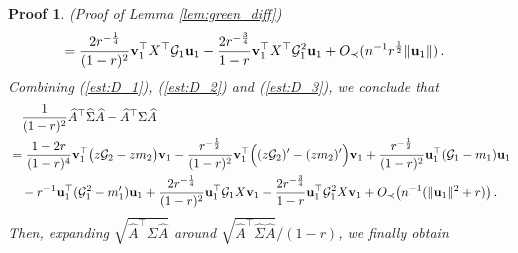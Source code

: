 \documentclass[12pt]{article}
\numberwithin{equation}{section}
\newtheorem{myPro}{Proof}
\theoremstyle{remark}
\newcommand{\1}{{\rm 1}\kern-0.24em{\rm I}}
\begin{document}
\begin{appendices}
\begin{myPro}{(Proof of Lemma \ref{lem:green_diff})}
\begin{align}
  &= \frac{2r^{-\frac 14}}{(1-r)^2}  {\bf v}_1^{\top} {X}^{\top} \mathcal{G}_1{\bf u}_1 - \frac{2r^{-\frac 34}}{1-r}{\bf v}_1^{\top} {X}^{\top} \mathcal{G}_1^2{\bf u}_1  + O_\prec(n^{-1}r^{\frac 12} \Vert {\bf u}_1\Vert)\,.
 \end{align}
Combining (\ref{est:D_1}), (\ref{est:D_2}) and (\ref{est:D_3}), we  conclude that 
\begin{align}\label{est:Repre_1}
&\quad \frac{1}{(1-r)^2} \widehat A^{\top}\widehat\Sigma \widehat A - \widehat A^{\top}\Sigma \widehat A\notag\\
&= \frac{1-2r}{(1-r)^4} {\bf v}_1^{\top} \big( z\mathcal{G}_2-zm_2\big){\bf v}_1  - \frac{r^{-\frac 12}}{(1-r)^2} {\bf v}_1^{\top}\Big((z\mathcal{G}_2)'-(zm_2)'\Big){\bf v}_1 +  \frac{r^{-\frac 12}}{(1-r)^2} {\bf u}_1^{\top}(\mathcal{G}_1-m_1){\bf u}_1  \notag\\
& \quad - r^{-1}{\bf u}_1^{\top}(\mathcal{G}_1^2- m_1'){\bf u}_1 +  \frac{2r^{-\frac 14}}{(1-r)^2}{\bf u}_1^{\top}  \mathcal{G}_1 {X}{\bf v}_1- \frac{2r^{-\frac 34}}{1-r}  {\bf u}_1^{\top} \mathcal{G}_1^2 {X}{\bf v}_1+ O_\prec\big(n^{-1}(\Vert {\bf u}_1 \Vert^2+r)\big)\, .
\end{align}
Then,  expanding  $\sqrt{\widehat A^{\top}\Sigma \widehat A}$ around $\sqrt{ \widehat A^{\top}\widehat\Sigma \widehat A }/(1-r)$, we  finally obtain 

\end{myPro}
\end{appendices}
\end{document}
